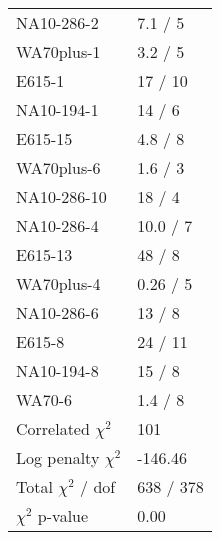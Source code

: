 \documentclass[14pt]{report}
\begin{document}
\begin{table}
\begin{center}
{\begin{tabular}{lp{2.57cm}}
  NA10-286-2 & 7.1 / 5  \\ 
  WA70plus-1 & 3.2 / 5  \\ 
  E615-1 & 17 / 10  \\ 
  NA10-194-1 & 14 / 6  \\ 
  E615-15 & 4.8 / 8  \\ 
  WA70plus-6 & 1.6 / 3  \\ 
  NA10-286-10 & 18 / 4  \\ 
  NA10-286-4 & 10.0 / 7  \\ 
  E615-13 & 48 / 8  \\ 
  WA70plus-4 & 0.26 / 5  \\ 
  NA10-286-6 & 13 / 8  \\ 
  E615-8 & 24 / 11  \\ 
  NA10-194-8 & 15 / 8  \\ 
  WA70-6 & 1.4 / 8  \\ 
  Correlated $\chi^2$  & 101  \\ 
  Log penalty $\chi^2$  & -146.46  \\ 
  \rowcolor{white}
      \midrule
  Total $\chi^2$ / dof  & 638 / 378  \\ 
  \rowcolor{white}
      \midrule
  $\chi^2$ p-value  & 0.00   \\ 
      \bottomrule
    \end{tabular}
  }
  \end{center}
\end{table}
\end{document}
